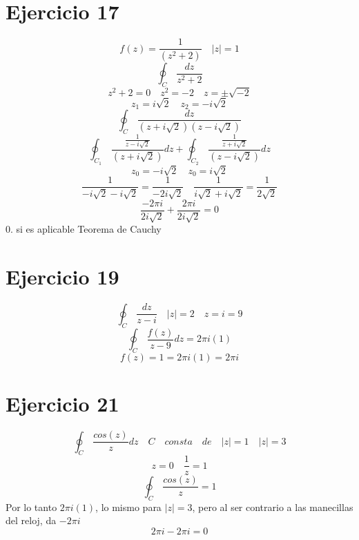 \documentclass{article}
\begin{document}
\section{Ejercicio 17}
\[
f(z)= \frac{1}{(z^2+2)} \quad |z|=1
\]
\begin{equation}
\oint_{C}  \, \frac{dz}{z^2+2}
\end{equation}
\begin{equation}
z^2+2=0 \quad z^2=-2 \quad z=\pm \sqrt{-2}
\end{equation}
\begin{equation}
z_1=i\sqrt{2} \quad z_2=-i\sqrt{2}
\end{equation}
\begin{equation}
\oint_{C}  \, \frac{dz}{(z+i\sqrt{2})(z-i\sqrt{2})}
\end{equation}
\begin{equation}
\oint_{C_1}  \, \frac{\frac{1}{z-i\sqrt{2}}}{(z+i\sqrt{2})} dz +\oint_{C_2}  \, \frac{\frac{1}{z+i\sqrt{2}}}{(z-i\sqrt{2})} dz
\end{equation}
\begin{equation}
z_0=-i\sqrt{2} \quad z_0=i\sqrt{2}
\end{equation}
\begin{equation}
\frac{1}{-i\sqrt{2}-i\sqrt{2}}=\frac{1}{-2i\sqrt{2}}\quad \frac{1}{i\sqrt{2}+i\sqrt{2}}=\frac{1}{2\sqrt{2}}
\end{equation}
\begin{equation}
\frac{-2\pi i}{2i\sqrt{2}}+\frac{2\pi i}{2i\sqrt{2}}=0
\end{equation}
0. si es aplicable Teorema de Cauchy

\section{Ejercicio 19}
\[
\oint_{C}  \, \frac{dz}{z-i} \quad |z|=2 \quad z=i=9
\]
\begin{equation}
\oint_{C}  \, \frac{f(z)}{z-9}dz=2\pi i(1)
\end{equation}
\begin{equation}
f(z)=1=2\pi i(1)=2\pi i
\end{equation}


\section{Ejercicio 21}
\[
\oint_{C}  \, \frac{cos(z)}{z}dz \quad C \quad consta \quad de \quad |z|=1 \quad |z|=3
\]
\begin{equation}
z=0 \quad \frac{1}{z}=1
\end{equation}
\begin{equation}
\oint_{C}  \, \frac{cos(z)}{z}=1
\end{equation}
Por lo tanto \( 2\pi i (1)\), lo mismo para \(|z|=3\), pero al ser contrario a las manecillas del reloj, da \(-2\pi i\)
\begin{equation}
2\pi i-2\pi i=0
\end{equation}
\end{document}
